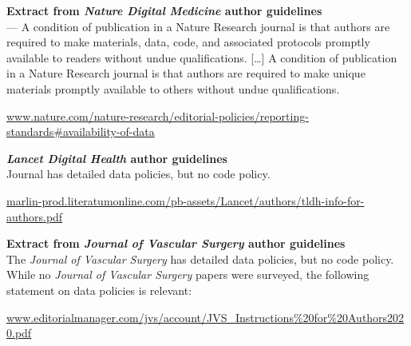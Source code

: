 \documentclass[10pt,a4paper]{article}
\begin{document}
\noindent\textbf{Extract from \emph{Nature Digital Medicine\/} author guidelines}\\
{\sf --- A condition of publication in a Nature Research journal is that authors are required to make materials, data, code, and associated protocols promptly available to readers without undue qualifications. [\ldots] A condition of publication in a Nature Research journal is that authors are required to make unique materials promptly available to others without undue qualifications.}

\specifyurl
\url{www.nature.com/nature-research/editorial-policies/reporting-standards#availability-of-data}

\noindent\textbf{\emph{Lancet Digital Health\/} author guidelines}\\
Journal has detailed data policies, but no code policy.

\specifyurl
\url{marlin-prod.literatumonline.com/pb-assets/Lancet/authors/tldh-info-for-authors.pdf}

\noindent\textbf{Extract from \emph{Journal of Vascular Surgery\/} author guidelines}\\
The \emph{Journal of Vascular Surgery\/} has detailed data policies, but no code policy. While no \emph{Journal of Vascular Surgery\/} papers were surveyed, the following statement on data policies is relevant:

\vskip 3mm 
\specifyurl
\url{www.editorialmanager.com/jvs/account/JVS_Instructions%20for%20Authors2020.pdf}
\end{document}
